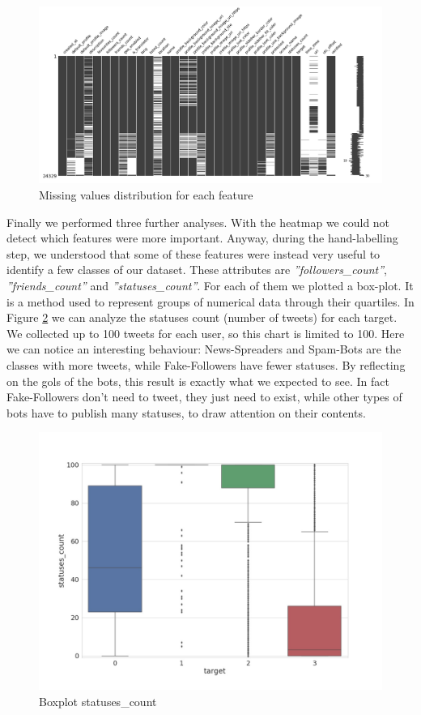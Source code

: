 \begin{figure}
	\centering
	\includegraphics[width=\columnwidth]{chapter3/figure/msno.png}
	\caption{Missing values distribution for each feature}
	\label{fig:msno}
\end{figure}

\newpage
Finally we performed three further analyses. With the heatmap we could not detect which features were more important. Anyway, during the hand-labelling step, we understood that some of these features were instead very useful to identify a few classes of our dataset. These attributes are \emph{''followers\_count''}, \emph{''friends\_count''} and \emph{''statuses\_count''}. For each of them we plotted a box-plot. It is a method used to represent groups of numerical data through their quartiles. In Figure \ref{fig:box_statuses} we can analyze the statuses count (number of tweets) for each target. We collected up to 100 tweets for each user, so this chart is limited to 100. Here we can notice an interesting behaviour: News-Spreaders and Spam-Bots are the classes with more tweets, while Fake-Followers have fewer statuses. By reflecting on the gols of the bots, this result is exactly what we expected to see. In fact Fake-Followers don't need to tweet, they just need to exist, while other types of bots have to publish many statuses, to draw attention on their contents.

\begin{figure}
	\centering
	\includegraphics[width=\columnwidth]{chapter3/figure/boxplot.jpg}
	\caption{Boxplot statuses\_count}
	\label{fig:box_statuses}
\end{figure}
\newpage

